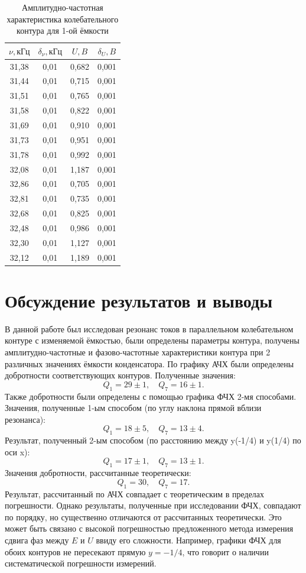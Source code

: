 \documentclass[a4paper, 12pt]{article}
\begin{document}
\begin{table}[h!]
\begin{center}
\begin{tabular}{|c|c|c|c|}
\hline
$\nu, кГц$ & $\delta_{\nu}, кГц$ & $U, B$  & $\delta_U, B$ \\ \hline
31,38  & 0,01    & 0,682 & 0,001 \\ \hline
31,44  & 0,01    & 0,715 & 0,001 \\ \hline
31,51  & 0,01    & 0,765 & 0,001 \\ \hline
31,58  & 0,01    & 0,822 & 0,001 \\ \hline
31,69  & 0,01    & 0,910 & 0,001 \\ \hline
31,73  & 0,01    & 0,951 & 0,001 \\ \hline
31,78  & 0,01    & 0,992 & 0,001 \\ \hline
32,08  & 0,01    & 1,187 & 0,001 \\ \hline
32,86  & 0,01    & 0,705 & 0,001 \\ \hline
32,81  & 0,01    & 0,735 & 0,001 \\ \hline
32,68  & 0,01    & 0,825 & 0,001 \\ \hline
32,48  & 0,01    & 0,986 & 0,001 \\ \hline
32,30  & 0,01    & 1,127 & 0,001 \\ \hline
32,12  & 0,01    & 1,189 & 0,001 \\ \hline
\end{tabular}
\end{center}
\caption{Амплитудно-частотная характеристика колебательного контура для 1-ой ёмкости}
\label{tab2}
\end{table}

\section{Обсуждение результатов и выводы}

В данной работе был исследован резонанс токов в параллельном колебательном контуре с изменяемой ёмкостью, были определены параметры контура, получены амплитудно-частотные и фазово-частотные характеристики контура при 2 различных значениях ёмкости конденсатора.  По графику АЧХ были определены добротности соответствующих контуров. Полученные значения:
$$ Q_1 = 29\pm1, \quad Q_7 = 16\pm1. $$
Также добротности были определены с помощью графика ФЧХ 2-мя способами. Значения, полученные 1-ым способом (по углу наклона прямой вблизи резонанса):
$$ Q_1 = 18\pm5, \quad Q_7 = 13\pm4. $$
Результат, полученный 2-ым способом (по расстоянию между y(-1/4) и y(1/4) по оси x):
$$ Q_1 = 17\pm1, \quad Q_7 = 13\pm1. $$
Значения добротности, рассчитанные теоретически:
$$ Q_1 = 30, \quad Q_7 = 17. $$
Результат, рассчитанный по АЧХ совпадает с теоретическим в пределах погрешности. Однако результаты, полученные при исследовании ФЧХ, совпадают по порядку, но существенно отличаются от рассчитанных теоретически. Это может быть связано с высокой погрешностью предложенного метода измерения сдвига фаз между $E$ и $U$ ввиду его сложности. Например, графики ФЧХ для обоих контуров не пересекают прямую $y = -1/4$, что говорит о наличии систематической погрешности измерений.
\end{document}
